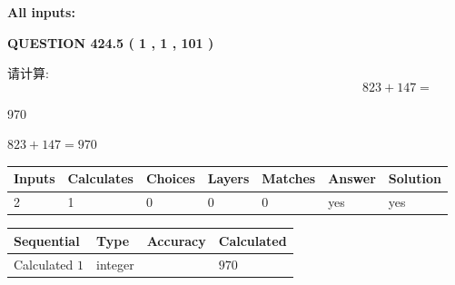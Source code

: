 \documentclass{ctexart}
\begin{document}
   
   
   
\noindent\vspace{0.1in}\hspace{-0.08in} {\textbf{\Large{All inputs: }}}
   
   
  
\vspace{0.2in}
  
{\textbf{\Large{QUESTION
424.5 
 ( 1 , 1 , 101 )
}}}
  
  
 
请计算:
\begin{equation}
823 +  %
147 = \nonumber
\end{equation}
 
 
 
\noindent{}
 
 

970
 
 
\noindent{}
 
 

 
 
 
\noindent{}
 
 

$ %
823 +  %
147=   %
970$
 
 
\noindent{}
 
 

 
   
   
   
   
\noindent\begin{tabular}{|l|l|l|l|l|l|l|}
 \hline
Inputs & Calculates & Choices & Layers & Matches & Answer & Solution \\ \hline
 2  & 
 1  & 
 0
  & 
 0  & 
 0  & 
  yes & 
  yes 
  \\ \hline
 \end{tabular}
   
   
   
   
\noindent{}
   
   
  
  
\noindent\begin{tabular}{|l|l|l|l|}
\hline
 Sequential & Type & Accuracy & Calculated \\ 
\hline
 
 
  Calculated $  1 $ & integer &  & 
  $ 970 $ 
 \\  \hline  
 \end{tabular}
   
\end{document}
